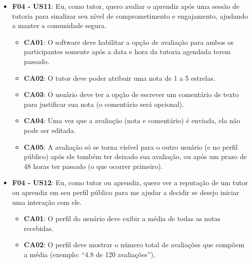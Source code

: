 \begin{itemize}
\begin{itemize}
\item \textbf{CA05}: A avaliação só se torna visível para o outro usuário (e no perfil público) após ele também ter deixado sua avaliação, ou após um prazo de 48 horas ter passado (o que ocorrer primeiro).

\end{itemize}

\item \textbf{F04 - US11}: Eu, como tutor, quero avaliar o aprendiz após uma sessão de tutoria para sinalizar seu nível de comprometimento e engajamento, ajudando a manter a comunidade segura.

\begin{itemize}

\item \textbf{CA01}: O software deve habilitar a opção de avaliação para ambos os participantes somente após a data e hora da tutoria agendada terem passado.

\item \textbf{CA02}: O tutor deve poder atribuir uma nota de 1 a 5 estrelas.

\item \textbf{CA03}: O usuário deve ter a opção de escrever um comentário de texto para justificar sua nota (o comentário será opcional).

\item \textbf{CA04}: Uma vez que a avaliação (nota e comentário) é enviada, ela não pode ser editada.

\item \textbf{CA05}: A avaliação só se torna visível para o outro usuário (e no perfil público) após ele também ter deixado sua avaliação, ou após um prazo de 48 horas ter passado (o que ocorrer primeiro).

\end{itemize}

\item \textbf{F04 - US12}: Eu, como tutor ou aprendiz, quero ver a reputação de um tutor ou aprendiz em seu perfil público para me ajudar a decidir se desejo iniciar uma interação com ele.

\begin{itemize}

\item \textbf{CA01}: O perfil do usuário deve exibir a média de todas as notas recebidas.

\item \textbf{CA02}: O perfil deve mostrar o número total de avaliações que compõem a média (exemplo: ``4.8 de 120 avaliações'').


\end{itemize}
\end{itemize}
